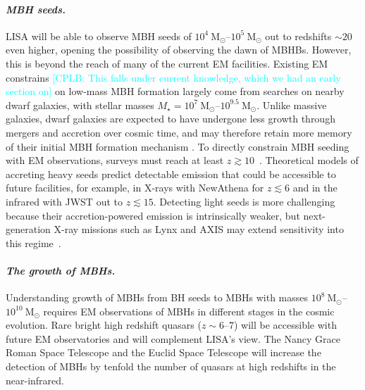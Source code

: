 \documentclass[a4paper,12pt]{article}
\newcommand{\cplb}[1]{\textcolor{cyan}{[CPLB: #1]}}
\begin{document}
\paragraph{\normalfont\textit{MBH seeds.}}
LISA will be able to observe MBH seeds of $10^{4}~\mathrm{M}_{\odot}$--$10^{5}~\mathrm{M}_{\odot}$ out to redshifts $\sim20$ \cite{amaro2017laser} even higher, opening the possibility of observing the dawn of MBHBs. However, this is beyond the reach of many of the current EM facilities. Existing EM constrains \cplb{This falls under current knowledge, which we had an early section on} on low-mass MBH formation largely come from searches on nearby dwarf galaxies, with stellar masses $M_{\star} = 10^{7}~\mathrm{M}_{\odot}$--$10^{9.5}~\mathrm{M}_{\odot}$\cite{reines2015relations,baldassare201550,mezcua2016population,mezcua2018intermediate}. Unlike massive galaxies, dwarf galaxies are expected to have undergone less growth through mergers and accretion over cosmic time, and may therefore retain more memory of their initial MBH formation mechanism \cite{habouzit2017blossoms}. To directly constrain MBH seeding with EM observations, surveys must reach at least $z\gtrsim10$~\cite{valiante2018chasing}. Theoretical models of accreting heavy seeds predict detectable emission that could be accessible to future facilities, for example, in X-rays with NewAthena for $z\lesssim6$ and in the infrared with JWST out to $z\lesssim15$. Detecting light seeds is more challenging because their accretion-powered emission is intrinsically weaker, but next-generation X-ray missions such as Lynx and AXIS may extend sensitivity into this regime~\cite{pacucci2015shining,natarajan2017unveiling,valiante2018chasing,barrow2018observational}.

\paragraph{\normalfont\textit{The growth of MBHs.}}
Understanding growth of MBHs from BH seeds to MBHs with masses $10^{8}~\mathrm{M}_{\odot}$--$10^{10}~\mathrm{M}_{\odot}$ requires EM observations of MBHs in different stages in the cosmic evolution. Rare bright high redshift quasars ($z\sim6$--$7$) \cite{banados2018chandra,matsuoka2019subaru,yang2020poniua} will be accessible with future EM observatories and will complement LISA's view. The Nancy Grace Roman Space Telescope \cite{fan1903first} and the Euclid Space Telescope \cite{barnett2019euclid} will increase the detection of MBHs by tenfold the number of quasars at high redshifts in the near-infrared. 
\end{document}
